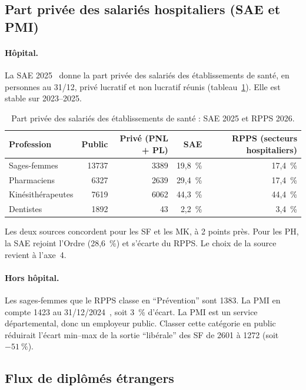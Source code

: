 \documentclass[11pt]{article}
\begin{document}
\subsection{Part privée des salariés hospitaliers (SAE et PMI)}

\paragraph{Hôpital.}
La SAE 2025~\cite{sae708} donne la part privée des salariés des
établissements de santé, en personnes au 31/12, privé lucratif et non
lucratif réunis (tableau~\ref{tab:sae}). Elle est stable sur 2023--2025.

\begin{table}[htbp]
\centering\small
\caption{Part privée des salariés des établissements de santé : SAE 2025 et RPPS 2026\mesure.}\label{tab:sae}
\begin{tabular}{lrrrr}
\toprule
Profession & Public & Privé (PNL + PL) & SAE & RPPS (secteurs hospitaliers) \\
\midrule
Sages-femmes & \num{13737} & \num{3389} & 19,8~\% & 17,4~\% \\
Pharmaciens & \num{6327} & \num{2639} & 29,4~\% & 17,4~\% \\
Kinésithérapeutes & \num{7619} & \num{6062} & 44,3~\% & 44,4~\% \\
Dentistes & \num{1892} & \num{43} & 2,2~\% & 3,4~\% \\
\bottomrule
\end{tabular}
\end{table}

Les deux sources concordent pour les SF et les MK, à 2 points près. Pour
les PH, la SAE rejoint l'Ordre (28,6~\%) et s'écarte du RPPS. Le choix de
la source revient à l'axe~4.

\paragraph{Hors hôpital.}
Les sages-femmes que le RPPS classe en \enquote{Prévention} sont
\num{1383}\mesure. La PMI en compte \num{1423} au
31/12/2024~\cite{dreespmi}, soit 3~\%\derive{} d'écart. La PMI est un
service départemental, donc un employeur public. Classer cette catégorie en
public réduirait l'écart min--max de la sortie \enquote{libérale} des SF de
\num{2601} à \num{1272}\derive{} (soit $-51~\%$).

\subsection{Flux de diplômés étrangers}
\end{document}
